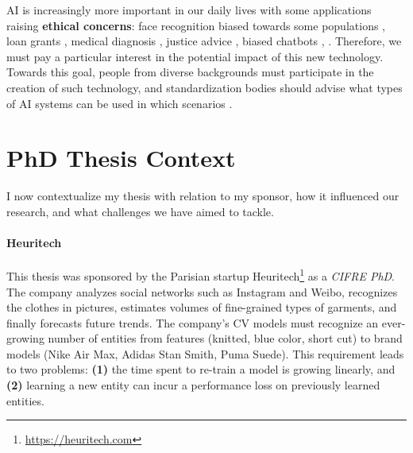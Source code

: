 \ac{AI} is increasingly more important in our daily lives with some applications raising
\textbf{ethical concerns}: face recognition biased towards some populations
\citep{grother2019facerecoethic}, loan grants \citep{anglekar2021loangrantml}, medical diagnosis
\citep{lazzazabal2020medicalbias}, justice advice \citep{russel2020justicefairness}, biased chatbots
\citep{sheng2019lmbias}, \etc. Therefore, we must pay a particular interest in the potential impact
of this new technology. Towards this goal, people from diverse backgrounds must participate in the
creation of such technology, and standardization bodies \citep{tommasi2021fairness} should advise
what types of \ac{AI} systems can be used in which scenarios \citep{gebru2019aiethichandbook}.

\section{PhD Thesis Context}

I now contextualize my thesis with relation to my sponsor, how it influenced our research, and what
challenges we have aimed to tackle.

\paragraph{Heuritech} This thesis was sponsored by the Parisian startup
Heuritech\footnote{\url{https://heuritech.com}} as a \textit{CIFRE PhD}. The company analyzes social
networks such as Instagram and Weibo, recognizes the clothes in pictures, estimates
volumes of fine-grained types of garments, and finally forecasts future trends. The company's
\acf{CV} models must recognize an ever-growing number of entities from features (\eg knitted, blue
color, short cut) to brand models (\eg Nike Air Max, Adidas Stan Smith, Puma Suede). This
requirement leads to two problems: \textbf{(1)} the time spent to re-train a model is growing
linearly, and \textbf{(2)} learning a new entity can incur a performance loss on previously learned
entities.

